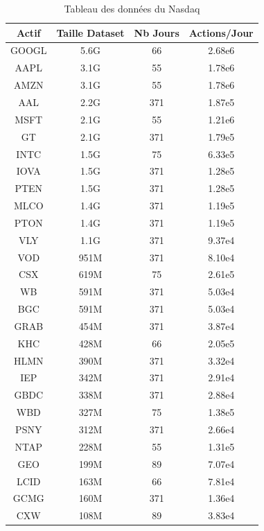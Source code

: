 \documentclass[10pt,a4paper]{article}
\theoremstyle{definition}
\theoremstyle{remark}
\begin{document}
\begin{table}[h!]
\centering
\begin{tabular}{|c|c|c|c|}
\hline
\textbf{Actif} & \textbf{Taille Dataset} & \textbf{Nb Jours} & \textbf{Actions/Jour}\\ \hline
GOOGL & 5.6G & 66 & 2.68e6 \\ \hline
AAPL & 3.1G & 55 & 1.78e6 \\ \hline
AMZN & 3.1G & 55 & 1.78e6 \\ \hline
AAL & 2.2G & 371 & 1.87e5 \\ \hline
MSFT & 2.1G & 55 & 1.21e6 \\ \hline
GT & 2.1G & 371 & 1.79e5 \\ \hline
INTC & 1.5G & 75 & 6.33e5 \\ \hline
IOVA & 1.5G & 371 & 1.28e5 \\ \hline
PTEN & 1.5G & 371 & 1.28e5 \\ \hline
MLCO & 1.4G & 371 & 1.19e5 \\ \hline
PTON & 1.4G & 371 & 1.19e5 \\ \hline
VLY & 1.1G & 371 & 9.37e4 \\ \hline
VOD & 951M & 371 & 8.10e4 \\ \hline
CSX & 619M & 75 & 2.61e5 \\ \hline
WB & 591M & 371 & 5.03e4 \\ \hline
BGC & 591M & 371 & 5.03e4 \\ \hline
GRAB & 454M & 371 & 3.87e4 \\ \hline
KHC & 428M & 66 & 2.05e5 \\ \hline
HLMN & 390M & 371 & 3.32e4 \\ \hline
IEP & 342M & 371 & 2.91e4 \\ \hline
GBDC & 338M & 371 & 2.88e4 \\ \hline
WBD & 327M & 75 & 1.38e5 \\ \hline
PSNY & 312M & 371 & 2.66e4 \\ \hline
NTAP & 228M & 55 & 1.31e5 \\ \hline
GEO & 199M & 89 & 7.07e4 \\ \hline
LCID & 163M & 66 & 7.81e4 \\ \hline
GCMG & 160M & 371 & 1.36e4 \\ \hline
CXW & 108M & 89 & 3.83e4 \\ \hline
\end{tabular}
\caption{Tableau des données du Nasdaq}
\label{tab:donnees_nasdaq}
\end{table}
\end{document}
